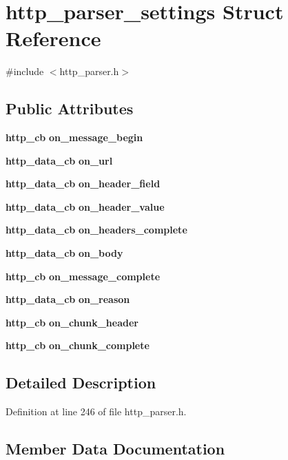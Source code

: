\section{http\+\_\+parser\+\_\+settings Struct Reference}
\label{structhttp__parser__settings}


{\ttfamily \#include $<$http\+\_\+parser.\+h$>$}

\subsection*{Public Attributes}
\begin{DoxyCompactItemize}
\item 
{\bf http\+\_\+cb} {\bf on\+\_\+message\+\_\+begin}
\item 
{\bf http\+\_\+data\+\_\+cb} {\bf on\+\_\+url}
\item 
{\bf http\+\_\+data\+\_\+cb} {\bf on\+\_\+header\+\_\+field}
\item 
{\bf http\+\_\+data\+\_\+cb} {\bf on\+\_\+header\+\_\+value}
\item 
{\bf http\+\_\+data\+\_\+cb} {\bf on\+\_\+headers\+\_\+complete}
\item 
{\bf http\+\_\+data\+\_\+cb} {\bf on\+\_\+body}
\item 
{\bf http\+\_\+cb} {\bf on\+\_\+message\+\_\+complete}
\item 
{\bf http\+\_\+data\+\_\+cb} {\bf on\+\_\+reason}
\item 
{\bf http\+\_\+cb} {\bf on\+\_\+chunk\+\_\+header}
\item 
{\bf http\+\_\+cb} {\bf on\+\_\+chunk\+\_\+complete}
\end{DoxyCompactItemize}


\subsection{Detailed Description}


Definition at line 246 of file http\+\_\+parser.\+h.



\subsection{Member Data Documentation}
